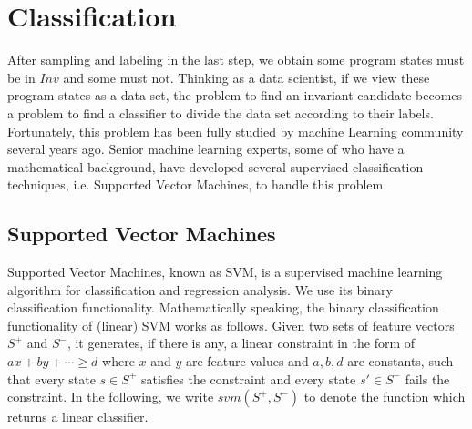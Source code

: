 
\section{Classification} %
\label{sec:classification}

After sampling and labeling in the last step, we obtain some program states must be in $Inv$ and some must not. 
Thinking as a data scientist, if we view these program states as a data set, 
the problem to find an invariant candidate becomes a problem to find a classifier to divide the data set according to their labels.
Fortunately, this problem has been fully studied by machine Learning community several years ago.
Senior machine learning experts, some of who have a mathematical background, 
have developed several supervised classification techniques, i.e. Supported Vector Machines, to handle this problem.



\subsection{Supported Vector Machines}

Supported Vector Machines, known as SVM, is a supervised machine learning algorithm for classification and regression analysis. 
We use its binary classification functionality. 
Mathematically speaking, the binary classification functionality of (linear) SVM works as follows. 
Given two sets of feature vectors $S^+$ and $S^-$, it generates, if there is any, 
a linear constraint in the form of $ax + by + \cdots \geq d$ where $x$ and $y$ are feature values and $a, b, d$ are constants, 
such that every state $s \in S^+$ satisfies the constraint and every state $s' \in S^-$ fails the constraint. 
In the following, we write $svm(S^+, S^-)$ to denote the function which returns a linear classifier.

